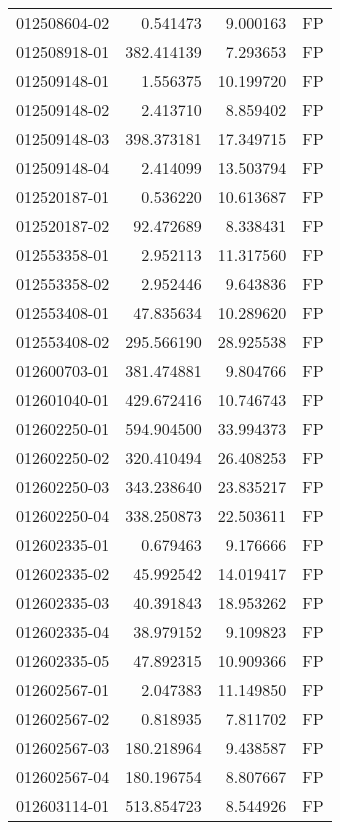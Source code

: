 \begin{tabular}{lrrl}
012508604-02 &    0.541473 &       9.000163 &   FP \\
012508918-01 &  382.414139 &       7.293653 &   FP \\
012509148-01 &    1.556375 &      10.199720 &   FP \\
012509148-02 &    2.413710 &       8.859402 &   FP \\
012509148-03 &  398.373181 &      17.349715 &   FP \\
012509148-04 &    2.414099 &      13.503794 &   FP \\
012520187-01 &    0.536220 &      10.613687 &   FP \\
012520187-02 &   92.472689 &       8.338431 &   FP \\
012553358-01 &    2.952113 &      11.317560 &   FP \\
012553358-02 &    2.952446 &       9.643836 &   FP \\
012553408-01 &   47.835634 &      10.289620 &   FP \\
012553408-02 &  295.566190 &      28.925538 &   FP \\
012600703-01 &  381.474881 &       9.804766 &   FP \\
012601040-01 &  429.672416 &      10.746743 &   FP \\
012602250-01 &  594.904500 &      33.994373 &   FP \\
012602250-02 &  320.410494 &      26.408253 &   FP \\
012602250-03 &  343.238640 &      23.835217 &   FP \\
012602250-04 &  338.250873 &      22.503611 &   FP \\
012602335-01 &    0.679463 &       9.176666 &   FP \\
012602335-02 &   45.992542 &      14.019417 &   FP \\
012602335-03 &   40.391843 &      18.953262 &   FP \\
012602335-04 &   38.979152 &       9.109823 &   FP \\
012602335-05 &   47.892315 &      10.909366 &   FP \\
012602567-01 &    2.047383 &      11.149850 &   FP \\
012602567-02 &    0.818935 &       7.811702 &   FP \\
012602567-03 &  180.218964 &       9.438587 &   FP \\
012602567-04 &  180.196754 &       8.807667 &   FP \\
012603114-01 &  513.854723 &       8.544926 &   FP \\

\end{tabular}
